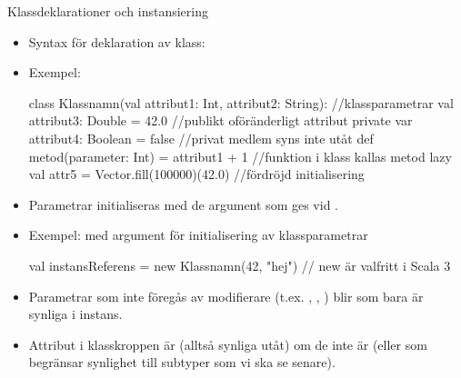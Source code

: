 \begin{Slide}{Klassdeklarationer och instansiering}\SlideFontSmall
\setlength{\leftmargini}{0pt}
\begin{itemize}
\item Syntax för deklaration av klass: \\ \vspace{0.5em}
\item Exempel: 
\begin{Code}
class Klassnamn(val attribut1: Int, attribut2: String):  //klassparametrar
  val attribut3: Double = 42.0              //publikt oföränderligt attribut
  private var attribut4: Boolean = false    //privat medlem syns inte utåt
  def metod(parameter: Int) = attribut1 + 1 //funktion i klass kallas metod
  lazy val attr5 = Vector.fill(100000)(42.0)     //fördröjd initialisering
\end{Code}

\item Parametrar initialiseras med de argument som ges vid .
\item Exempel:  med argument för initialisering av klassparametrar
\begin{Code}
val instansReferens = new Klassnamn(42, "hej")  // new är valfritt i Scala 3 
\end{Code}

\item Parametrar som inte föregås av modifierare (t.ex. , , ) blir  som bara är synliga i  instans.
\item Attribut i klasskroppen är  (alltså synliga utåt) om de inte är  (eller  som begränsar synlighet till subtyper som vi ska se senare).
\end{itemize}
\end{Slide}




